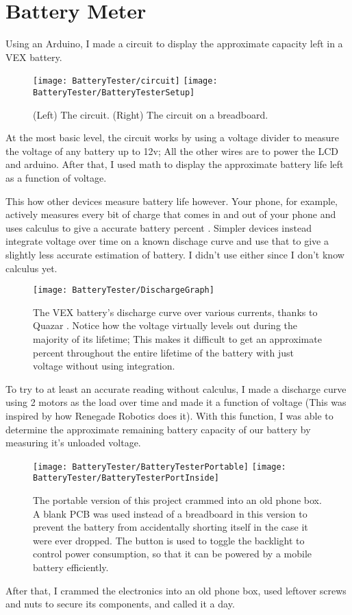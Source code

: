 \section{Battery Meter}
Using an Arduino, I made a circuit to display the approximate capacity left in a VEX battery.

\begin{figure}[h]
    \centering
    \texttt{[image: BatteryTester/circuit]}
    \texttt{[image: BatteryTester/BatteryTesterSetup]}
    \caption{
        (Left) The circuit. (Right) The circuit on a breadboard.
    }
\end{figure}

At the most basic level, the circuit works by using a voltage divider to measure the voltage of any battery up to 12v; All the other wires are to power the LCD and arduino. After that, I used math to display the approximate battery life left as a function of voltage.

This how other devices measure battery life however. Your phone, for example, actively measures every bit of charge that comes in and out of your phone and uses calculus to give a accurate battery percent \cite{CoulombCounting}. Simpler devices instead integrate voltage over time on a known dischage curve \cite{IntegrationVoltage} and use that to give a slightly less accurate estimation of battery. I didn't use either since I don't know calculus yet.

\begin{figure}[h]
    \centering
    \texttt{[image: BatteryTester/DischargeGraph]}
    \caption{
        The VEX battery's discharge curve over various currents, thanks to Quazar \cite{Quazar}. Notice how the voltage virtually levels out during the majority of its lifetime; This makes it difficult to get an approximate percent throughout the entire lifetime of the battery with just voltage without using integration.
    }
\end{figure}

To try to at least an accurate reading without calculus, I made a discharge curve using 2 motors as the load over time and made it a function of voltage (This was inspired by how Renegade Robotics \cite{RenegadeRobotics} does it). With this function, I was able to determine the approximate remaining battery capacity of our battery by measuring it's unloaded voltage.

\begin{figure}[h]
    \centering
    \texttt{[image: BatteryTester/BatteryTesterPortable]}
    \texttt{[image: BatteryTester/BatteryTesterPortInside]}
    \caption{
    The portable version of this project crammed into an old phone box. A blank PCB was used instead of a breadboard in this version to prevent the battery from accidentally shorting itself in the case it were ever dropped. The button is used to toggle the backlight to control power consumption, so that it can be powered by a mobile battery efficiently.
    }
\end{figure}

After that, I crammed the electronics into an old phone box, used leftover screws and nuts to secure its components, and called it a day.
